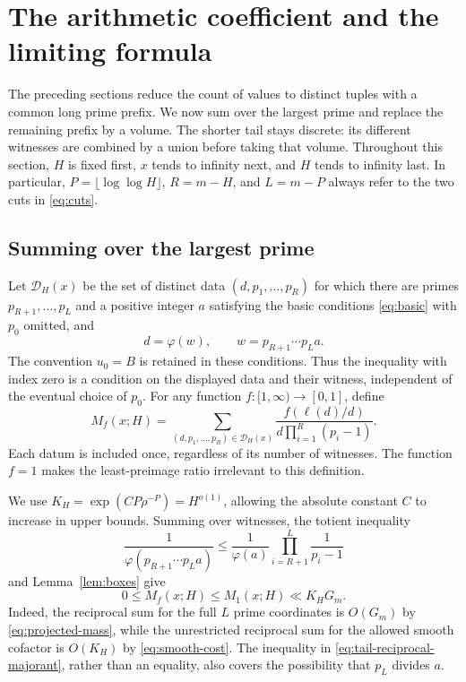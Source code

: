 \section{The arithmetic coefficient and the limiting formula}
\label{sec:limits}

The preceding sections reduce the count of values to distinct tuples with
a common long prime prefix.  We now sum over the largest prime and replace
the remaining prefix by a volume.  The shorter tail stays discrete: its
different witnesses are combined by a union before taking that volume.
Throughout this section, $H$ is fixed first, $x$ tends to infinity next,
and $H$ tends to infinity last.  In particular, $P=\lfloor\log\log H\rfloor$,
$R=m-H$, and $L=m-P$ always refer to the two cuts in \eqref{eq:cuts}.

\subsection{Summing over the largest prime}

Let $\mathcal D_H(x)$ be the set of distinct data
$(d,p_1,\ldots,p_R)$ for which there are primes
$p_{R+1},\ldots,p_L$ and a positive integer $a$ satisfying
the basic conditions \eqref{eq:basic} with $p_0$ omitted, and
\[
 d=\varphi(w),\qquad w=p_{R+1}\cdots p_La.
\]
The convention $u_0=B$ is retained in these conditions.  Thus the
inequality with index zero is a condition on the displayed data and
their witness, independent of the eventual choice of $p_0$.
For any function $f:[1,\infty)\to[0,1]$, define
\begin{equation}
 M_f(x;H)=
 \sum_{(d,p_1,\ldots,p_R)\in\mathcal D_H(x)}
 \frac{f(\ell(d)/d)}{d\prod_{i=1}^R(p_i-1)}.
 \label{eq:mass}
\end{equation}
Each datum is included once, regardless of its number of witnesses.
The function $f=1$ makes the least-preimage ratio irrelevant to this
definition.

We use $K_H=\exp(CP\rho^{-P})=H^{o(1)}$, allowing the absolute constant
$C$ to increase in upper bounds.  Summing over witnesses, the totient
inequality
\begin{equation}
 \frac{1}{\varphi(p_{R+1}\cdots p_La)}
 \le \frac{1}{\varphi(a)}
       \prod_{i=R+1}^L\frac{1}{p_i-1}
 \label{eq:tail-reciprocal-majorant}
\end{equation}
and Lemma~\ref{lem:boxes} give
\begin{equation}
 0\le M_f(x;H)\le M_1(x;H)\ll K_HG_m.
 \label{eq:mass-upper}
\end{equation}
Indeed, the reciprocal sum for the full $L$ prime coordinates is
$O(G_m)$ by \eqref{eq:projected-mass}, while the unrestricted reciprocal
sum for the allowed smooth cofactor is $O(K_H)$ by
\eqref{eq:smooth-cost}.  The inequality in
\eqref{eq:tail-reciprocal-majorant}, rather than an equality, also
covers the possibility that $p_L$ divides $a$.


